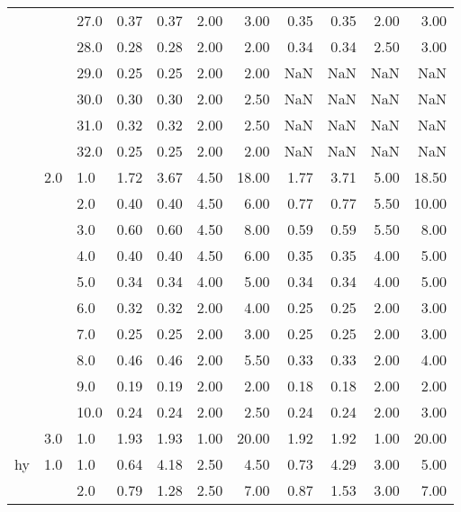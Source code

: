 \begin{tabular}{lllrrrrrrrr}
   &     & 27.0 &       0.37 &      0.37 & 2.00 &   3.00 &       0.35 &      0.35 & 2.00 &   3.00 \\
   &     & 28.0 &       0.28 &      0.28 & 2.00 &   2.00 &       0.34 &      0.34 & 2.50 &   3.00 \\
   &     & 29.0 &       0.25 &      0.25 & 2.00 &   2.00 &        NaN &       NaN &  NaN &    NaN \\
   &     & 30.0 &       0.30 &      0.30 & 2.00 &   2.50 &        NaN &       NaN &  NaN &    NaN \\
   &     & 31.0 &       0.32 &      0.32 & 2.00 &   2.50 &        NaN &       NaN &  NaN &    NaN \\
   &     & 32.0 &       0.25 &      0.25 & 2.00 &   2.00 &        NaN &       NaN &  NaN &    NaN \\
   & 2.0 & 1.0  &       1.72 &      3.67 & 4.50 &  18.00 &       1.77 &      3.71 & 5.00 &  18.50 \\
   &     & 2.0  &       0.40 &      0.40 & 4.50 &   6.00 &       0.77 &      0.77 & 5.50 &  10.00 \\
   &     & 3.0  &       0.60 &      0.60 & 4.50 &   8.00 &       0.59 &      0.59 & 5.50 &   8.00 \\
   &     & 4.0  &       0.40 &      0.40 & 4.50 &   6.00 &       0.35 &      0.35 & 4.00 &   5.00 \\
   &     & 5.0  &       0.34 &      0.34 & 4.00 &   5.00 &       0.34 &      0.34 & 4.00 &   5.00 \\
   &     & 6.0  &       0.32 &      0.32 & 2.00 &   4.00 &       0.25 &      0.25 & 2.00 &   3.00 \\
   &     & 7.0  &       0.25 &      0.25 & 2.00 &   3.00 &       0.25 &      0.25 & 2.00 &   3.00 \\
   &     & 8.0  &       0.46 &      0.46 & 2.00 &   5.50 &       0.33 &      0.33 & 2.00 &   4.00 \\
   &     & 9.0  &       0.19 &      0.19 & 2.00 &   2.00 &       0.18 &      0.18 & 2.00 &   2.00 \\
   &     & 10.0 &       0.24 &      0.24 & 2.00 &   2.50 &       0.24 &      0.24 & 2.00 &   3.00 \\
   & 3.0 & 1.0  &       1.93 &      1.93 & 1.00 &  20.00 &       1.92 &      1.92 & 1.00 &  20.00 \\
hy & 1.0 & 1.0  &       0.64 &      4.18 & 2.50 &   4.50 &       0.73 &      4.29 & 3.00 &   5.00 \\
   &     & 2.0  &       0.79 &      1.28 & 2.50 &   7.00 &       0.87 &      1.53 & 3.00 &   7.00 \\

\end{tabular}
